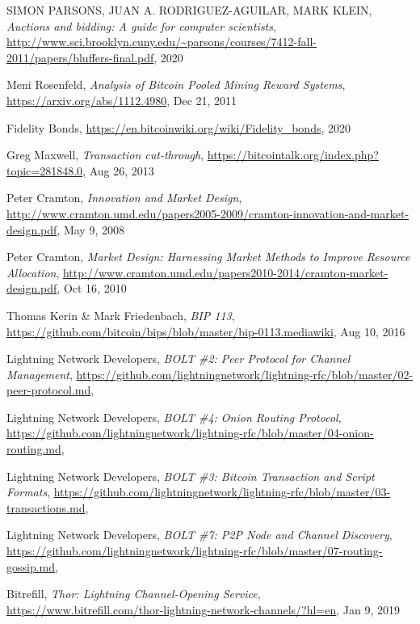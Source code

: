 \documentclass[10pt,a4paper]{article}
\theoremstyle{definition}
\begin{document}
\begin{thebibliography}{9}
    SIMON PARSONS, JUAN A. RODRIGUEZ-AGUILAR, MARK KLEIN, 
    \textit{Auctions and bidding: A guide for computer scientists},
    \url{http://www.sci.brooklyn.cuny.edu/~parsons/courses/7412-fall-2011/papers/bluffers-final.pdf},
    2020

    Meni Rosenfeld,
    \textit{Analysis of Bitcoin Pooled Mining Reward Systems},
    \url{https://arxiv.org/abs/1112.4980},
    Dec 21, 2011

    Fidelity Bonds,
    \url{https://en.bitcoinwiki.org/wiki/Fidelity_bonds},
    2020

    Greg Maxwell,
    \textit{Transaction cut-through},
    \url{https://bitcointalk.org/index.php?topic=281848.0},
    Aug 26, 2013

    Peter Cramton,
    \textit{Innovation and Market Design},
    \url{http://www.cramton.umd.edu/papers2005-2009/cramton-innovation-and-market-design.pdf},
    May 9, 2008

    Peter Cramton,
    \textit{Market Design: Harnessing Market Methods to Improve Resource Allocation},
    \url{http://www.cramton.umd.edu/papers2010-2014/cramton-market-design.pdf},
    Oct 16, 2010

    Thomas Kerin \& Mark Friedenbach,
    \textit{BIP 113},
    \url{https://github.com/bitcoin/bips/blob/master/bip-0113.mediawiki},
    Aug 10, 2016

    Lightning Network Developers,
    \textit{BOLT \#2: Peer Protocol for Channel Management},
    \url{https://github.com/lightningnetwork/lightning-rfc/blob/master/02-peer-protocol.md},

    Lightning Network Developers,
    \textit{BOLT \#4: Onion Routing Protocol},
    \url{https://github.com/lightningnetwork/lightning-rfc/blob/master/04-onion-routing.md},

    Lightning Network Developers,
    \textit{BOLT \#3: Bitcoin Transaction and Script Formats},
    \url{https://github.com/lightningnetwork/lightning-rfc/blob/master/03-transactions.md},

    Lightning Network Developers,
    \textit{BOLT \#7: P2P Node and Channel Discovery},
    \url{https://github.com/lightningnetwork/lightning-rfc/blob/master/07-routing-gossip.md},

    Bitrefill,
    \textit{Thor: Lightning Channel-Opening Service},
    \url{https://www.bitrefill.com/thor-lightning-network-channels/?hl=en},
    Jan 9, 2019


\end{thebibliography}
\end{document}
